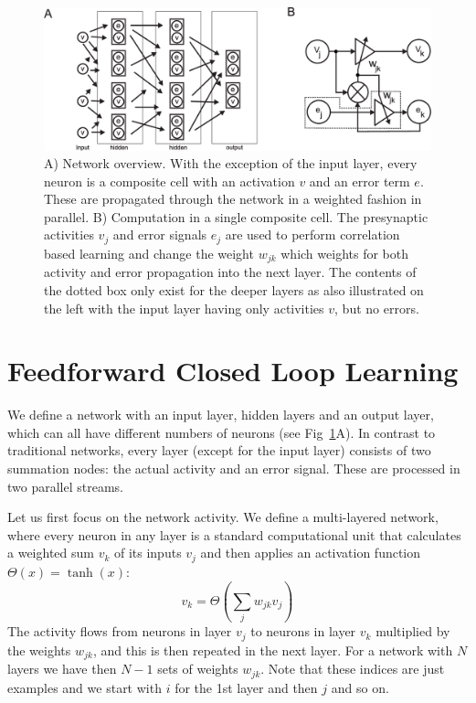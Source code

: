 \documentclass[Afour,sageh,times]{sagej}
\begin{document}
\begin{figure}[!ht]
  \centering
  \includegraphics[width=\columnwidth]{netw_together}
  \caption{A) Network overview. With the exception of the input layer, every
    neuron is a composite cell with an activation $v$ and an error
    term $e$. These are propagated through the network in a weighted
    fashion in parallel.  B) Computation in a single composite cell.
    The presynaptic activities $v_j$ and error signals $e_j$ are used
    to perform correlation based learning and change the weight
    $w_{jk}$ which weights for both activity and error propagation into the next
    layer. The contents of the dotted box only exist for the deeper
    layers as also illustrated on the left with the input layer
    having only activities $v$, but no errors. \label{netw_together}}
\end{figure}


\section{Feedforward Closed Loop Learning}
We define a network with an input layer, hidden layers and an output
layer, which can all have different numbers of neurons (see
Fig~\ref{netw_together}A). In contrast to traditional
networks, every layer (except for the input layer) consists of two
summation nodes: the actual activity and an error signal. These
are processed in two parallel streams.

Let us first focus on the network activity. We define a multi-layered
network, where every neuron in any layer is a standard computational unit that
calculates a weighted sum $v_k$ of its inputs $v_j$ and then applies
an activation function $\Theta(x) = \tanh(x)$:
\begin{equation}
  v_k = \Theta\left( \sum_j w_{jk} v_{j} \right) \label{act_sum}
\end{equation}
The activity flows from neurons in layer $v_j$ to neurons in
layer $v_k$ multiplied by the weights $w_{jk}$, and this
is then repeated in the next layer. For a network with
$N$ layers we have then $N-1$ sets of weights $w_{jk}$. Note that these
indices are just examples and we start with $i$ for the 1st layer and then
$j$ and so on.
\end{document}
